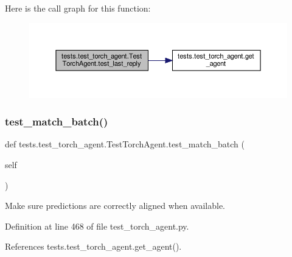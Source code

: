 Here is the call graph for this function\+:
\nopagebreak
\begin{figure}[H]
\begin{center}
\leavevmode
\includegraphics[width=350pt]{classtests_1_1test__torch__agent_1_1TestTorchAgent_a7c1c12023294608a146271f4fe1574ea_cgraph}
\end{center}
\end{figure}
\mbox{\label{classtests_1_1test__torch__agent_1_1TestTorchAgent_abe59ca8c2f6927c0ba6f0e5ce7d3a4f2}} 
\subsubsection{\texorpdfstring{test\+\_\+match\+\_\+batch()}{test\_match\_batch()}}
{\footnotesize\ttfamily def tests.\+test\+\_\+torch\+\_\+agent.\+Test\+Torch\+Agent.\+test\+\_\+match\+\_\+batch (\begin{DoxyParamCaption}\item[{}]{self }\end{DoxyParamCaption})}

\begin{DoxyVerb}Make sure predictions are correctly aligned when available.\end{DoxyVerb}
 

Definition at line 468 of file test\+\_\+torch\+\_\+agent.\+py.



References tests.\+test\+\_\+torch\+\_\+agent.\+get\+\_\+agent().

